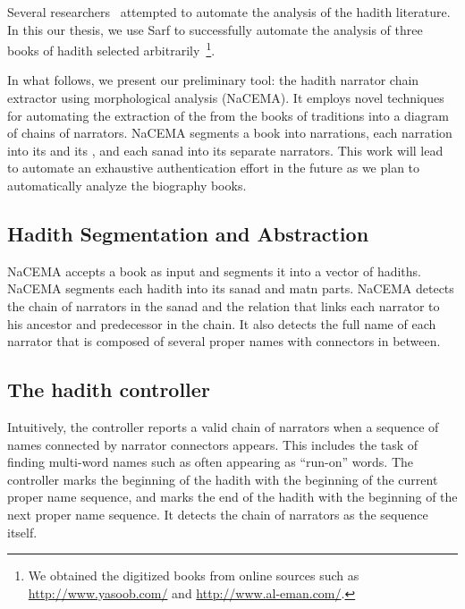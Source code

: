 \documentclass[a4,12pt]{report}
\newcommand{\noArRL}[1]{\arabfalse\RL{#1}\arabtrue}
\begin{document}
Several researchers~\cite{Hadithopaedia:08,Azmi-2010} attempted to automate 
the analysis of the hadith literature. 
In this our thesis, we use Sarf to successfully automate the
analysis of three books of hadith selected 
arbitrarily~\cite{IbnHanbal,AlKulayni,AlTousi}\footnote{We obtained
  the digitized books from online sources such as 
  \href{http://www.yasoob.com/}{http://www.yasoob.com/} and 
  \href{http://www.al-eman.com/}{http://www.al-eman.com/}. }.

In what follows, we present our preliminary tool:
the hadith {narrator chain 
extractor using morphological analysis} (NaCEMA).
It employs novel techniques for automating
the extraction of the \noArRL{sanad} from the books of traditions 
into a diagram of chains of narrators. NaCEMA segments
a book into narrations, each narration into its \noArRL{matn} 
and its \noArRL{sanad}, 
and each sanad into its separate narrators. 
This work will lead to 
automate an exhaustive \noArRL{.hady_t} authentication 
effort in the future as we plan to 
automatically analyze the biography books.

\subsection{Hadith Segmentation and Abstraction}
\label{sec:hadithSegmentation}

NaCEMA accepts a book as input
and segments it into a vector of hadiths. 
NaCEMA segments each hadith into its
sanad and matn parts. 
NaCEMA 
detects the chain of narrators in the sanad and 
the relation that links each narrator to his ancestor and 
predecessor in the chain. 
It also detects the full name of each narrator that is
composed of several proper names with connectors
in between. 


\subsection{The hadith controller}
\label{sec:controller}

Intuitively, the controller reports a valid chain 
of narrators when a sequence of names
connected by narrator connectors appears. 
This includes the task of finding multi-word names
such as  often appearing as ``run-on'' words.
The controller marks the beginning of the hadith with the beginning of 
the current proper name sequence,
and marks the end of the hadith with the beginning of the 
next proper name sequence. 
It detects the chain of narrators as the sequence itself. 
\end{document}
